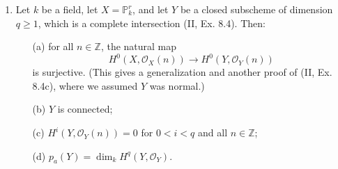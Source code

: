 \documentclass{article}
\newcommand{\fO}{\mathscr{O}}
\newcommand{\PP}{\mathbb{P}}
\newcommand{\Z}{\mathbb{Z}}
\begin{document}
\begin{enumerate} [label=\textbf{\arabic*.}, leftmargin=0em]
\item Let $k$ be a field, let $X = \PP_k^r$, and let $Y$ be a closed subscheme of dimension $q \geq 1$, which is a complete intersection (II, Ex. 8.4). Then:
\begin{itemize}
  \item[(a)] for all $n \in \Z$, the natural map
  \begin{equation*}
    H^0(X, \fO_X(n)) \to H^0(Y, \fO_Y(n))
  \end{equation*}
  is surjective. (This gives a generalization and another proof of (II, Ex. 8.4c), where we assumed $Y$ was normal.)
  \item[(b)] $Y$ is connected;
  \item[(c)] $H^i(Y, \fO_Y(n)) = 0$ for $0 < i < q$ and all $n \in \Z$;
  \item[(d)] $p_a(Y) = \dim_k{H^q(Y, \fO_Y)}$.
\end{itemize}


\end{enumerate}
\end{document}
